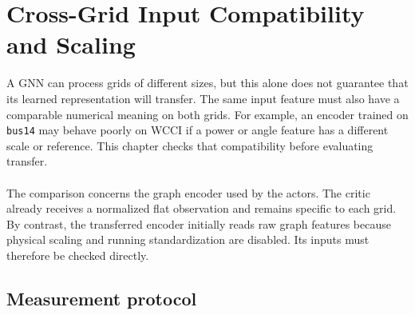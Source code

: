 \chapter{\texorpdfstring{Cross-Grid Input Compatibility and Scaling}{Cross-Grid Input Compatibility and Scaling}}
\label{ch:encoder-inputs}

A GNN can process grids of different sizes, but this alone does
not guarantee that its learned representation will transfer. The same input
feature must also have a comparable numerical meaning on both grids. For
example, an encoder trained on \texttt{bus14} may behave poorly on WCCI if a
power or angle feature has a different scale or reference. This chapter checks
that compatibility before evaluating transfer.
\\
\\
The comparison concerns the graph encoder used by the actors.
The critic already receives a normalized flat observation and remains specific
to each grid. By contrast, the transferred encoder initially reads raw graph
features because physical scaling and running standardization are disabled.
Its inputs must therefore be checked directly.


\section{Measurement protocol}
\label{sec:wcci-protocol}

